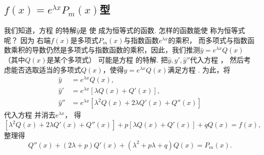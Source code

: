 \subsection{\texorpdfstring{\(f(x) = e^{\lambda x} P_m(x)\)型}{第一类：指数函数与幂级数的乘积}}
我们知道，方程  的特解\(\hat{y}\)是%
使  成为恒等式的函数.
怎样的函数能使  称为恒等式呢？
因为  右端\(f(x)\)是多项式\(P_m(x)\)与指数函数\(e^{\lambda x}\)的乘积，%
而多项式与指数函数乘积的导数仍然是多项式与指数函数的乘积，因此，我们推测\(\hat{y} = e^{\lambda x} Q(x)\)（其中\(Q(x)\)是某个多项式）%
可能是方程  的特解.
把\(\hat{y}, \hat{y}', \hat{y}''\)代入方程 ，%
然后考虑能否选取适当的多项式\(Q(x)\)，使得\(\hat{y} = e^{\lambda x} Q(x)\)满足方程 .
为此，将\begin{align*}
\hat{y} &= e^{\lambda x} Q(x), \\
\hat{y}' &= e^{\lambda x} [ \lambda Q(x) + Q'(x) ], \\
\hat{y}'' &= e^{\lambda x} [ \lambda^2 Q(x) + 2\lambda Q'(x) + Q''(x) ]
\end{align*}
代入方程  并消去\(e^{\lambda x}\)，%
得\[
	[ \lambda^2 Q(x) + 2\lambda Q'(x) + Q''(x) ] + p [ \lambda Q(x) + Q'(x) ] + q Q(x)= f(x),
\]
整理得
\begin{equation}\label{equation:微分方程.常系数非齐次线性微分方程.中间步骤1}
Q''(x) + (2\lambda+p) Q'(x) + (\lambda^2+p\lambda+q) Q(x) = P_m(x).
\end{equation}

